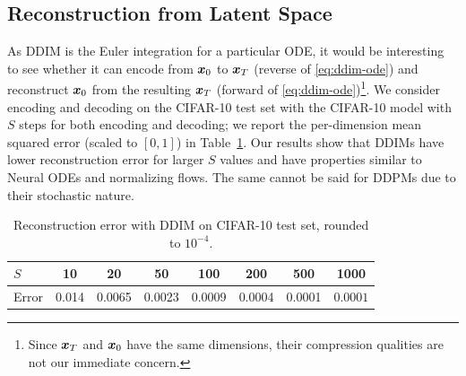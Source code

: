 \subsection{Reconstruction from Latent Space}
As DDIM is the Euler integration for a particular ODE, it would be interesting to see whether it can encode from ${\bm{x}}_0$ to ${\bm{x}}_T$ (reverse of \eqref{eq:ddim-ode}) and reconstruct ${\bm{x}}_0$ from the resulting ${\bm{x}}_T$ (forward of \eqref{eq:ddim-ode})\footnote{Since ${\bm{x}}_T$ and ${\bm{x}}_0$ have the same dimensions, their compression qualities are not our immediate concern.}. We consider encoding and decoding on the CIFAR-10 test set with the CIFAR-10 model with $S$ steps for both encoding and decoding; we report the per-dimension mean squared error (scaled to $[0, 1]$) in Table~\ref{tab:cifar10-recon}. Our results show that DDIMs have lower reconstruction error for larger $S$ values and have properties similar to Neural ODEs and normalizing flows.
The same cannot be said for DDPMs due to their stochastic nature.
\begin{table}
    \centering
    \caption{Reconstruction error with DDIM on CIFAR-10 test set, rounded to $10^{-4}$.}
    \begin{tabular}{l|ccccccc}
    \toprule
    $S$ & 10 & 20 & 50 & 100 & 200 & 500 & 1000 \\
    \midrule
    Error & 0.014 & 0.0065 & 0.0023 & 0.0009 & 0.0004 & 0.0001 & $0.0001$ \\
    \bottomrule
    \end{tabular}
    \label{tab:cifar10-recon}
\end{table}